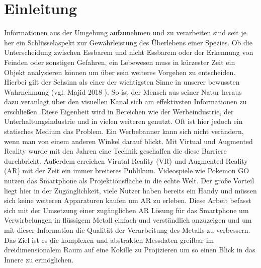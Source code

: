 \section{Einleitung}
Informationen aus der Umgebung aufzunehmen und zu verarbeiten sind seit je her ein Schlüsselaspekt zur Gewährleistung des Überlebens einer Spezies. Ob die Unterscheidung zwischen Essbarem und nicht Essbarem oder der Erkennung von Feinden oder sonstigen Gefahren, ein Lebewesen muss in kürzester Zeit ein Objekt analysieren können um über sein weiteres Vorgehen zu entscheiden. \newline
Hierbei gilt der Sehsinn als einer der wichtigsten Sinne in unserer bewussten Wahrnehmung (vgl. Majid 2018 \cite{Majid11369}). So ist der Mensch aus seiner Natur heraus dazu veranlagt über den visuellen Kanal sich am effektivsten Informationen zu erschließen. Diese Eigenheit wird in Bereichen wie der Werbeindustrie, der Unterhaltungsindustrie und in vielen weiteren genutzt. Oft ist hier jedoch ein statisches Medium das Problem. Ein Werbebanner kann sich nicht verändern, wenn man von einem anderen Winkel darauf blickt. Mit Virtual und Augmented Reality wurde mit den Jahren eine Technik geschaffen die diese Barriere durchbricht. Außerdem erreichen Virutal Reality (VR) und Augmented Reality (AR) mit der Zeit ein immer breiteres Publikum. Videospiele wie Pokemon GO nutzen das Smartphone als Projektionsfläche in die echte Welt. Der große Vorteil liegt hier in der Zugänglichkeit, viele Nutzer haben bereits ein Handy und müssen sich keine weiteren Apparaturen kaufen um AR zu erleben.\newline
Diese Arbeit befasst sich mit der Umsetzung einer zugänglichen AR Lösung für das Smartphone um Verwirbelungen in flüssigem Metall einfach und verständlich anzuzeigen und um mit dieser Information
die Qualität der Verarbeitung des Metalls zu verbessern. Das Ziel ist es die komplexen und abstrakten Messdaten greifbar im dreidimensionalem Raum auf eine Kokille zu Projizieren um so einen Blick in das Innere zu ermöglichen.